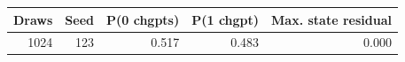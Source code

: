 \begin{tabular}{rrrrr}
\toprule
Draws & Seed & P(0 chgpts) & P(1 chgpt) & Max. state residual \\
\midrule
1024 & 123 & 0.517 & 0.483 & 0.000 \\
\bottomrule
\end{tabular}
